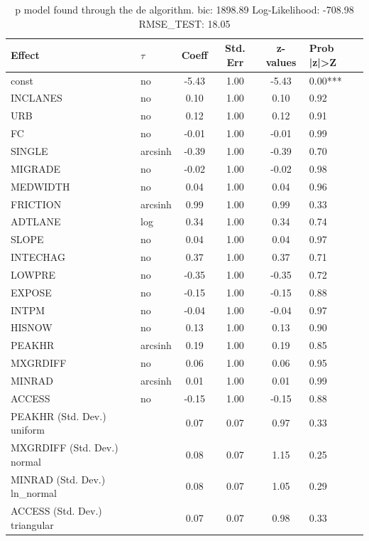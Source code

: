 \begin{table}
	\caption{p model found through the de algorithm. bic: 1898.89 Log-Likelihood: -708.98 RMSE_TEST: 18.05}
	\begin{center}
		\begin{tabular}{|l|l|c|c|c|l|}
			\hline
			Effect & $\tau$ & Coeff & Std. Err & z-values & Prob |z|>Z \\
			\hline
			const & no & -5.43 & 1.00 & -5.43 & 0.00*** \\
			\hline
			INCLANES & no & 0.10 & 1.00 & 0.10 & 0.92 \\
			\hline
			URB & no & 0.12 & 1.00 & 0.12 & 0.91 \\
			\hline
			FC & no & -0.01 & 1.00 & -0.01 & 0.99 \\
			\hline
			SINGLE & arcsinh & -0.39 & 1.00 & -0.39 & 0.70 \\
			\hline
			MIGRADE & no & -0.02 & 1.00 & -0.02 & 0.98 \\
			\hline
			MEDWIDTH & no & 0.04 & 1.00 & 0.04 & 0.96 \\
			\hline
			FRICTION & arcsinh & 0.99 & 1.00 & 0.99 & 0.33 \\
			\hline
			ADTLANE & log & 0.34 & 1.00 & 0.34 & 0.74 \\
			\hline
			SLOPE & no & 0.04 & 1.00 & 0.04 & 0.97 \\
			\hline
			INTECHAG & no & 0.37 & 1.00 & 0.37 & 0.71 \\
			\hline
			LOWPRE & no & -0.35 & 1.00 & -0.35 & 0.72 \\
			\hline
			EXPOSE & no & -0.15 & 1.00 & -0.15 & 0.88 \\
			\hline
			INTPM & no & -0.04 & 1.00 & -0.04 & 0.97 \\
			\hline
			HISNOW & no & 0.13 & 1.00 & 0.13 & 0.90 \\
			\hline
			PEAKHR & arcsinh & 0.19 & 1.00 & 0.19 & 0.85 \\
			\hline
			MXGRDIFF & no & 0.06 & 1.00 & 0.06 & 0.95 \\
			\hline
			MINRAD & arcsinh & 0.01 & 1.00 & 0.01 & 0.99 \\
			\hline
			ACCESS & no & -0.15 & 1.00 & -0.15 & 0.88 \\
			\hline
			PEAKHR (Std. Dev.) uniform &  & 0.07 & 0.07 & 0.97 & 0.33 \\
			\hline
			MXGRDIFF (Std. Dev.) normal &  & 0.08 & 0.07 & 1.15 & 0.25 \\
			\hline
			MINRAD (Std. Dev.) ln_normal &  & 0.08 & 0.07 & 1.05 & 0.29 \\
			\hline
			ACCESS (Std. Dev.) triangular &  & 0.07 & 0.07 & 0.98 & 0.33 \\
			\hline
		\end{tabular}
	\end{center}
\end{table}
